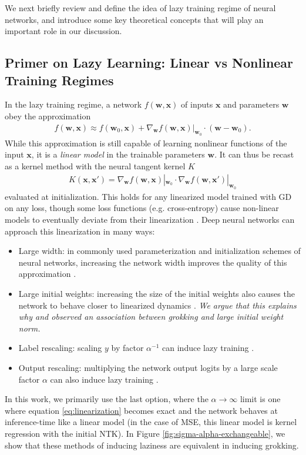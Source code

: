 \documentclass{article} %
\def\w{\bm w}
\def\x{\bm x}
\begin{document}
We next briefly review and define the idea of lazy training regime of neural networks, and introduce some key theoretical concepts that will play an important role in our discussion.

\subsection{Primer on Lazy Learning: Linear vs Nonlinear Training Regimes}\label{sec:lazy_primer}

In the lazy training regime, a network $f(\w, \x)$ of inputs $\x$ and parameters $\bm{w}$ obey the approximation 
\begin{align}\label{eq:linearization}
    f(\w,\x) \approx f(\w_0, \x) + \nabla_{\bm{w}} f(\w,\x)|_{\w_0} \cdot  (\bm{w}-\bm{w}_0) .
\end{align}
While this approximation is still capable of learning nonlinear functions of the input $\x$, it is a \textit{linear model} in the trainable parameters $\bm{w}$. It can thus be recast as a kernel method with the neural tangent kernel $K$
\begin{align}
    K(\x,\x') =  \nabla_{\bm{w}} f(\w,\x)|_{\w_0} \cdot \nabla_{\bm{w}} f(\w,\x')|_{\w_0}
\end{align}
evaluated at initialization. This holds for any linearized model trained with GD on any loss, though some loss functions (e.g. cross-entropy) cause non-linear models to eventually deviate from their linearization \citep{lee2019wide}. Deep neural networks can approach this linearization in many ways:
\begin{itemize}
    \item Large width: in commonly used parameterization and initialization schemes of neural networks, increasing the network width improves the quality of this approximation \cite{jacot2018neural,lee2019wide}. 
    \item Large initial weights: increasing the size of the initial weights also causes the network to behave closer to linearized dynamics \citep{chizat2019lazy}. \textit{We argue that this explains why \cite{liu2022omnigrok} and \cite{varma2023explaining} observed an association between grokking and large initial weight norm.} 
    \item Label rescaling: scaling $y$ by factor $\alpha^{-1}$ can induce lazy training \citep{geiger2020disentangling}. 
    \item Output rescaling: multiplying the network output logits by a large scale factor $\alpha$ can also induce lazy training \citep{chizat2019lazy}.
\end{itemize}
In this work, we primarily use the last option, where the $\alpha \to \infty$ limit is one where equation \ref{eq:linearization} becomes exact and the network behaves at inference-time like a linear model (in the case of MSE, this linear model is kernel regression with the initial NTK). In Figure \ref{fig:sigma-alpha-exchangeable}, we show that these methods of inducing laziness are equivalent in inducing grokking. 
\end{document}
